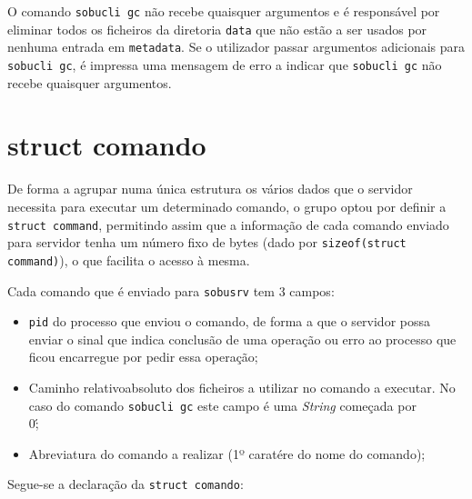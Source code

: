 \documentclass[a4paper,12pt,titlepage,draft,portuguese]{article}
\begin{document}
O comando \texttt{sobucli gc} não recebe quaisquer argumentos e é responsável por eliminar todos os ficheiros da diretoria \texttt{data\/} que não estão a ser usados por nenhuma entrada em \texttt{\/metadata}. Se o utilizador passar argumentos adicionais para \texttt{sobucli gc}, é impressa uma mensagem de erro a indicar que \texttt{sobucli gc} não recebe quaisquer argumentos.

\section{struct comando}

De forma a agrupar numa única estrutura os vários dados que o servidor necessita para executar um determinado comando, o grupo optou por definir a \texttt{struct command}, permitindo assim que a informação de cada comando enviado para servidor tenha um número fixo de bytes (dado por \texttt{sizeof(struct command)}), o que facilita o acesso à mesma. 

Cada comando que é enviado para \texttt{sobusrv} tem 3 campos:

	\begin{itemize}
		\item \texttt{pid} do processo que enviou o comando, de forma a que o servidor possa enviar o sinal que indica conclusão de uma operação ou erro ao processo que ficou encarregue por pedir essa operação;
		\item Caminho relativo\/absoluto dos ficheiros a utilizar no comando a executar. No caso do comando \texttt{sobucli gc} este campo é uma \emph{String} começada por \'\\0\';
		\item Abreviatura do comando a realizar (1º caratére do nome do comando); 
	\end{itemize}

	Segue-se a declaração da \texttt{struct comando}:
\end{document}
